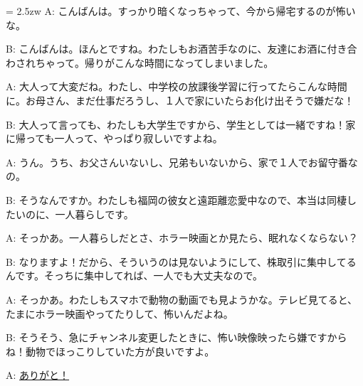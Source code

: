 \documentclass[11pt]{amsart}
\title{}
\author{}
\newenvironment{hangall}[1]{\hangindent = 2.5zw\everypar{\hangindent = 2.5zw}}{}
\begin{document}
\maketitle
\begin{hangall}{}%
A: こんばんは。すっかり暗くなっちゃって、今から帰宅するのが怖いな。

B: こんばんは。ほんとですね。わたしもお酒苦手なのに、友達にお酒に付き合わされちゃって。帰りがこんな時間になってしまいました。

A: 大人って大変だね。わたし、中学校の放課後学習に行ってたらこんな時間に。お母さん、まだ仕事だろうし、１人で家にいたらお化け出そうで嫌だな！

B: 大人って言っても、わたしも大学生ですから、学生としては一緒ですね！家に帰っても一人って、やっぱり寂しいですよね。

A: うん。うち、お父さんいないし、兄弟もいないから、家で１人でお留守番なの。

B: そうなんですか。わたしも福岡の彼女と遠距離恋愛中なので、本当は同棲したいのに、一人暮らしです。

A: そっかあ。一人暮らしだとさ、ホラー映画とか見たら、眠れなくならない？

B: なりますよ！だから、そういうのは見ないようにして、株取引に集中してるんです。そっちに集中してれば、一人でも大丈夫なので。

A: そっかあ。わたしもスマホで動物の動画でも見ようかな。テレビ見てると、たまにホラー映画やってたりして、怖いんだよね。

B: そうそう、急にチャンネル変更したときに、怖い映像映ったら嫌ですからね！動物でほっこりしていた方が良いですよ。

A: \ul{ありがと！}\end{hangall}
\end{document}
